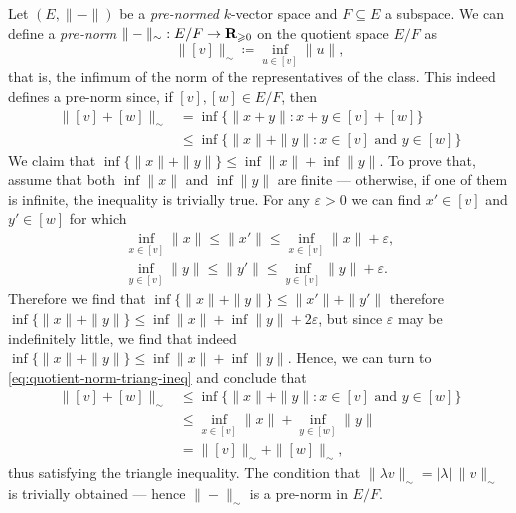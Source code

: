 \begin{example}
    \label{exp:prenorm-quotient-space}
    Let \((E, \| - \|)\) be a \emph{pre-normed} \(k\)-vector space and \(F
    \subseteq E\) a subspace. We can define a \emph{pre-norm} \(\| - \|_{\sim}: E/F
    \to \mathbf{R}_{\geqslant 0}\) on the quotient space \(E/F\) as
    \[
        \| [v] \|_{\sim} \coloneq \inf_{u \in [v]} \| u \|,
    \]
    that is, the infimum of the norm of the representatives of the class. This
    indeed defines a pre-norm since, if \([v], [w] \in E/F\), then
    \begin{align}\label{eq:quotient-norm-triang-ineq}
        \nonumber
        \| [v] + [w] \|_{\sim}
         & = \inf \{\|x + y\| \colon x + y \in [v] + [w]\}                         \\
         & \leq \inf \{\| x \| + \| y \| \colon x \in [v] \text{ and } y \in [w]\}
    \end{align}
    We claim that \(\inf \{\| x \| + \| y \|\} \leq \inf \| x \| + \inf \| y
    \|\). To prove that, assume that both \(\inf \| x \|\) and \(\inf \| y \|\) are
    finite --- otherwise, if one of them is infinite, the inequality is trivially
    true. For any \(\varepsilon > 0\) we can find \(x' \in [v]\) and \(y' \in
    [w]\) for which
    \begin{gather*}
        \inf_{x \in [v]} \| x \|
        \leq \| x' \|
        \leq \inf_{x \in [v]} \| x \| + \varepsilon,
        \\
        \inf_{y \in [v]} \| y \|
        \leq \| y' \|
        \leq \inf_{y \in [v]} \| y \| + \varepsilon.
    \end{gather*}
    Therefore we find that \(\inf \{\| x \| + \| y \|\} \leq \| x' \| + \| y' \|\)
    therefore \(\inf \{\| x \| + \| y \|\} \leq \inf \| x \| + \inf \| y \| + 2
    \varepsilon\), but since \(\varepsilon\) may be indefinitely little, we find
    that indeed \(\inf \{\| x \| + \| y \|\} \leq \inf \| x \| + \inf \| y
    \|\). Hence, we can turn to \cref{eq:quotient-norm-triang-ineq} and conclude
    that
    \begin{align*}
        \| [v] + [w] \|_{\sim}
         & \leq \inf \{\| x \| + \| y \| \colon x \in [v] \text{ and } y \in [w]\} \\
         & \leq \inf_{x \in [v]} \| x \| + \inf_{y \in [w]} \| y \|                \\
         & = \| [v] \|_{\sim} + \| [w] \|_{\sim},
    \end{align*}
    thus satisfying the triangle inequality. The condition that \(\| \lambda v
    \|_{\sim} = |\lambda|\, \| v \|_{\sim}\) is trivially obtained --- hence \(\| -
    \|_{\sim}\) is a pre-norm in \(E/F\).
\end{example}

